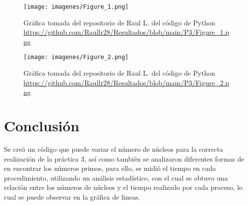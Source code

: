 \documentclass{article}
\begin{document}
 \begin{figure}[h]
     \centering
     \texttt{[image: imagenes/Figure\_1.png]}
        \caption{Gráfica tomada del repositorio de Raul L. del código de Python 
    \url{https://github.com/Raullr28/Resultados/blob/main/P3/Figure_1.png}}
     \label{}
 \end{figure}
 

 \begin{figure}[h]
     \centering
     \texttt{[image: imagenes/Figure\_2.png]}
        \caption{Gráfica tomada del repositorio de Raul L. del código de Python 
    \url{https://github.com/Raullr28/Resultados/blob/main/P3/Figure_2.png}}
     \label{}
 \end{figure}
 
 
 \newpage
 

 \section{Conclusión}

 Se creó un código que puede variar el número de núcleos para la correcta realización de la práctica 3, así como también se analizaron diferentes formas de en encontrar los números primos, para ello, se midió el tiempo en cada procedimiento, utilizando un análisis estadístico, con el cual se obtuvo una relación entre los números de núcleos y el tiempo realizado por cada proceso, lo cual se puede observar en la gráfica de lineas.


 
 

 
\end{document}
